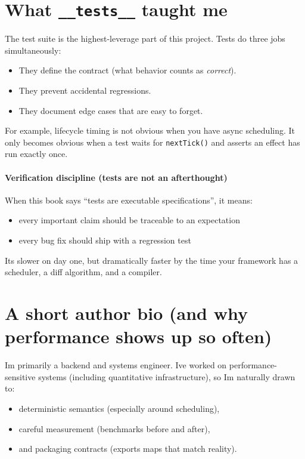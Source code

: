 \section{What \texttt{\_\_tests\_\_} taught me}
The test suite is the highest-leverage part of this project.
Tests do three jobs simultaneously:

\begin{itemize}
  \item They define the contract (what behavior counts as \emph{correct}).
  \item They prevent accidental regressions.
  \item They document edge cases that are easy to forget.
\end{itemize}

For example, lifecycle timing is not obvious when you have async scheduling.
It only becomes obvious when a test waits for \texttt{nextTick()} and asserts an effect has run exactly once.

\paragraph{Verification discipline (tests are not an afterthought)}
When this book says \textquotedblleft tests are executable specifications\textquotedblright, it means:

\begin{itemize}
  \item every important claim should be traceable to an expectation
  \item every bug fix should ship with a regression test
\end{itemize}

It\textquotesingle s slower on day one, but dramatically faster by the time your framework has a scheduler, a diff algorithm, and a compiler.

\section{A short author bio (and why performance shows up so often)}
I\textquotesingle m primarily a backend and systems engineer.
I\textquotesingle ve worked on performance-sensitive systems (including quantitative infrastructure), so I\textquotesingle m naturally drawn to:

\begin{itemize}
  \item deterministic semantics (especially around scheduling),
  \item careful measurement (benchmarks before and after),
  \item and packaging contracts (exports maps that match reality).
\end{itemize}

